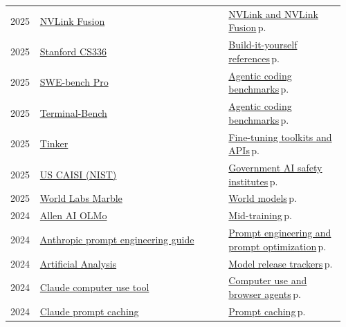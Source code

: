 \documentclass[10pt,a4paper,openany]{report}
\begin{document}
{\begin{longtable}{@{}p{0.07\linewidth}>{\raggedright}p{0.55\linewidth}>{\raggedright\arraybackslash}p{0.34\linewidth}@{}}
2025 & \href{https://www.nvidia.com/en-us/data-center/nvlink-fusion/}{NVLink Fusion} & \hyperref[c:hardware-6]{NVLink and NVLink Fusion}\,{\color{muted}\scriptsize p.\,\pageref{c:hardware-6}}\\
2025 & \href{https://stanford-cs336.github.io}{Stanford CS336} & \hyperref[c:training-9]{Build-it-yourself references}\,{\color{muted}\scriptsize p.\,\pageref{c:training-9}}\\
2025 & \href{https://scale.com/leaderboard/swe_bench_pro_public}{SWE-bench Pro} & \hyperref[c:evals-3]{Agentic coding benchmarks}\,{\color{muted}\scriptsize p.\,\pageref{c:evals-3}}\\
2025 & \href{https://www.tbench.ai}{Terminal-Bench} & \hyperref[c:evals-3]{Agentic coding benchmarks}\,{\color{muted}\scriptsize p.\,\pageref{c:evals-3}}\\
2025 & \href{https://thinkingmachines.ai/tinker/}{Tinker} & \hyperref[c:training-6]{Fine-tuning toolkits and APIs}\,{\color{muted}\scriptsize p.\,\pageref{c:training-6}}\\
2025 & \href{https://www.nist.gov/caisi}{US CAISI (NIST)} & \hyperref[c:safety-13]{Government AI safety institutes}\,{\color{muted}\scriptsize p.\,\pageref{c:safety-13}}\\
2025 & \href{https://marble.worldlabs.ai}{World Labs Marble} & \hyperref[c:embodied-2]{World models}\,{\color{muted}\scriptsize p.\,\pageref{c:embodied-2}}\\
2024 & \href{https://allenai.org/olmo}{Allen AI OLMo} & \hyperref[c:training-4]{Mid-training}\,{\color{muted}\scriptsize p.\,\pageref{c:training-4}}\\
2024 & \href{https://docs.claude.com/en/docs/build-with-claude/prompt-engineering/overview}{Anthropic prompt engineering guide} & \hyperref[c:practice-3]{Prompt engineering and prompt optimization}\,{\color{muted}\scriptsize p.\,\pageref{c:practice-3}}\\
2024 & \href{https://artificialanalysis.ai}{Artificial Analysis} & \hyperref[c:landscape-4]{Model release trackers}\,{\color{muted}\scriptsize p.\,\pageref{c:landscape-4}}\\
2024 & \href{https://docs.claude.com/en/docs/agents-and-tools/tool-use/computer-use-tool}{Claude computer use tool} & \hyperref[c:agents-9]{Computer use and browser agents}\,{\color{muted}\scriptsize p.\,\pageref{c:agents-9}}\\
2024 & \href{https://docs.claude.com/en/docs/build-with-claude/prompt-caching}{Claude prompt caching} & \hyperref[c:context-3]{Prompt caching}\,{\color{muted}\scriptsize p.\,\pageref{c:context-3}}\\

\end{longtable}}
\end{document}
